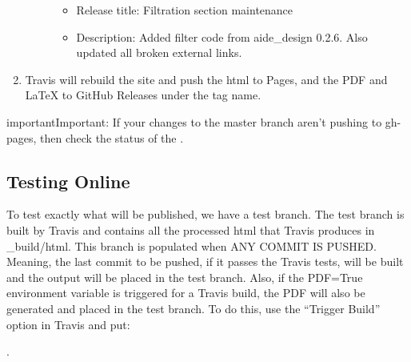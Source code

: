 \documentclass[letterpaper,10pt,english]{sphinxmanual}
\begin{document}
\begin{enumerate}
\begin{description}
\begin{itemize}
\item {} 
Release title: Filtration section maintenance

\item {} 
Description: Added filter code from aide\_design 0.2.6. Also updated all broken external links.

\end{itemize}

\end{description}

\item {} 
Travis will rebuild the site and push the html to Pages, and the PDF and LaTeX to GitHub Releases under the tag name.

\end{enumerate}

\begin{sphinxadmonition}{important}{Important:}
If your changes to the master branch aren’t pushing to gh-pages, then check the status of the .
\end{sphinxadmonition}


\subsection{Testing Online}
\label{\detokenize{Textbook_Creation_Help/rst_intro:testing-online}}\label{\detokenize{Textbook_Creation_Help/rst_intro:heading-testing-online}}
To test exactly what will be published, we have a test branch. The test branch is built by Travis and contains all the processed html that Travis produces in \_build/html. This branch is populated when ANY COMMIT IS PUSHED. Meaning, the last commit to be pushed, if it passes the Travis tests, will be built and the output will be placed in the test branch. Also, if the PDF=True environment variable is triggered for a Travis build, the PDF will also be generated and placed in the test branch. To do this, use the “Trigger Build” option in Travis and put:

%
\begin{sphinxVerbatim}[commandchars=\\\{\}]
     
\end{sphinxVerbatim}

.
\end{document}
